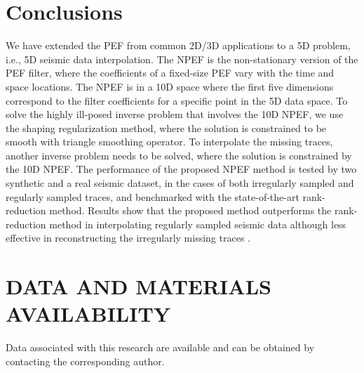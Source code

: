 \section{Conclusions}
We have extended the PEF from common 2D/3D applications to a 5D problem, i.e., 5D seismic data interpolation. The NPEF is the non-stationary version of the PEF filter, where the coefficients of a fixed-size PEF vary with the time and space locations. The NPEF is in a 10D space where the first five dimensions correspond to the filter coefficients for a specific point in the 5D data space. To solve the highly ill-posed inverse problem that involves the 10D NPEF, we use the  shaping regularization method, where the solution is constrained to be smooth with  triangle smoothing operator. To interpolate the missing traces, another inverse problem needs to be solved, where the solution is constrained by the 10D NPEF. The performance of the proposed NPEF method is tested by two synthetic and a real seismic dataset, in the cases of both irregularly sampled and regularly sampled traces, and benchmarked with the state-of-the-art rank-reduction method. Results show that the proposed method outperforms the rank-reduction method in interpolating regularly sampled seismic data although  less effective in reconstructing the irregularly missing traces .

\section{DATA AND MATERIALS AVAILABILITY}
Data associated with this research are available and can be obtained by contacting the corresponding author.





\newpage
\listoffigures




